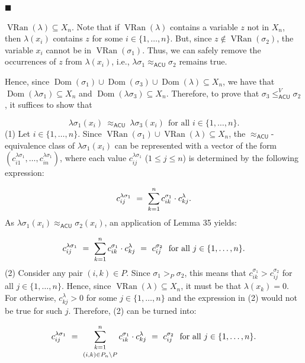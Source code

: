  
\par\noindent  $\blacksquare$ 
 
$\operatorname{VRan}(\lambda)\subseteq X_{n}$. Note that if $\operatorname{VRan}(\lambda)$ contains a variable $z$ not in $X_{n}$, then $\lambda(x_{i})$ contains $z$ for some $i\in\{1,\ldots,n\}$. But, since $z\not\in\operatorname{VRan}(\sigma_{2})$, the variable $x_{i}$ cannot be in $\operatorname{VRan}(\sigma_{1})$. Thus, we can safely remove the occurrences of $z$ from $\lambda(x_{i})$, i.e., $\lambda\sigma_{1}\approx_{\mathsf{ACU}}\sigma_{2}$ remains true.\par
 
 
  
Hence, since $\operatorname{Dom}(\sigma_{1})\cup\operatorname{Dom}(\sigma_{3})\cup%
\operatorname{Dom}(\lambda)\subseteq X_{n}$, we have that $\operatorname{Dom}(\lambda\sigma_{1})\subseteq X_{n}$ and $\operatorname{Dom}(\lambda\sigma_{3})\subseteq X_{n}$. Therefore, to prove that $\sigma_{3}\leq_{\mathsf{ACU}}^{V}\sigma_{2}$, it suffices to show that\par
    \[\lambda\sigma_{1}(x_{i})\ \approx_{\mathsf{ACU}}\ \lambda\sigma_{3}(x_{i})\ \ %
\mbox{for all }i\in\{1,\ldots,n\}.\]  (1)   
Let $i\in\{1,\ldots,n\}$. Since $\operatorname{VRan}(\sigma_{1})\cup\operatorname{VRan}(\lambda)\subseteq X_{n}$, the $\approx_{\mathsf{ACU}}$-equivalence class of $\lambda\sigma_{1}(x_{i})$ can be represented with a vector of the form $(c^{\lambda\sigma_{1}}_{i1},\ldots,c^{\lambda\sigma_{1}}_{in})$, where each value $c^{\lambda\sigma_{1}}_{ij}$ ($1\leq j\leq n$) is determined by the following expression:\par
    \[c^{\lambda\sigma_{1}}_{ij}\ =\ \sum_{k=1}^{n}c^{\sigma_{1}}_{ik}\cdot c^{%
\lambda}_{kj}.\]    
As $\lambda\sigma_{1}(x_{i})\approx_{\mathsf{ACU}}\sigma_{2}(x_{i})$, an application of Lemma 35 yields:\par
    \[c^{\lambda\sigma_{1}}_{ij}\ =\ \sum_{k=1}^{n}c^{\sigma_{1}}_{ik}\cdot c^{%
\lambda}_{kj}\ =\ c^{\sigma_{2}}_{ij}\ \ \mbox{for all }j\in\{1,\ldots,n\}.\]  (2)   
Consider any pair $(i,k)\in P$. Since $\sigma_{1}>_{P}\sigma_{2}$, this means that $c^{\sigma_{1}}_{ik}>c^{\sigma_{2}}_{ij}$ for all $j\in\{1,\ldots,n\}$. Hence, since $\operatorname{VRan}(\lambda)\subseteq X_{n}$, it must be that $\lambda(x_{k})=0$. For otherwise, $c^{\lambda}_{kj}>0$ for some $j\in\{1,\ldots,n\}$ and the expression in (2) would not be true for such $j$. Therefore, (2) can be turned into:\par
    \[c^{\lambda\sigma_{1}}_{ij}\ =\ \sum_{\begin{subarray}{c}k=1\\[2.45836pt]
(i,k)\in P_{n}\setminus P\end{subarray}}^{n}c^{\sigma_{1}}_{ik}\cdot c^{%
\lambda}_{kj}\ =\ c^{\sigma_{2}}_{ij}\ \ \mbox{for all }j\in\{1,\ldots,n\}.\]    
 

